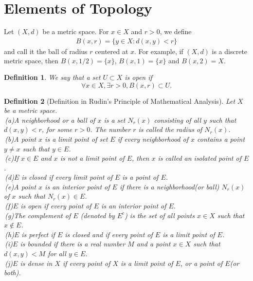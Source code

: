 \documentclass[12pt,leqno]{amsart}
\newtheorem{definition}{Definition}[section]
\theoremstyle{definition}
\begin{document}
\section{Elements of Topology}
\hspace*{1em}Let $(X,d)$ be a metric space. For $x\in X$ and $r>0$, we define 
\begin{align*}
    B(x,r) = \{y\in X: d(x,y) < r\}
\end{align*}
and call it the ball of radius $r$ centered at $x$. For example, if $(X,d)$ is a discrete metric space, then $B(x,1/2) = \{x\}$, $B(x,1) = \{x\}$ and $B(x,2) = X$.

\begin{definition}\label{openset}
We say that a set $U\subset X$ is open if $$\forall x\in X, \exists r > 0, B(x,r)\subset U.$$
\end{definition}

\begin{definition}[Definition in Rudin's Principle of Mathematical Analysis]Let $X$ be a metric space. \medskip \\
\hspace*{1em}\,(a)A neighborhood or a ball of $x$ is a set $N_r(x)$ consisting of all $y$ such that $d(x,y)<r$, \hspace*{2.3em}for some $r>0$. The number $r$ is called the radius of $N_r(x)$.\\
\hspace*{1em}\,(b)A point $x$ is a limit point of set $E$ if every neighborhood of $x$ contains a point $y\neq x$ \hspace*{2.3em}such that $y\in E$.\\
\hspace*{1em}\,(c)If $x\in E$ and $x$ is not a limit point of $E$, then $x$ is called an isolated point of $E$.\\
\hspace*{1em}\,(d)$E$ is closed if every limit point of $E$ is a point of $E$.\\
\hspace*{1em}\,(e)A point $x$ is an interior point of $E$ if there is a neighborhood(or ball) $N_r(x)$ of $x$ such \hspace*{2.3em}that $N_r(x)\in E$.\\
\hspace*{1em}\,(f)$E$ is open if every point of $E$ is an interior point of $E$.\\
\hspace*{1em}\,(g)The complement of $E$ (denoted by $E^c$) is the set of all points $x\in X$ such that $x\notin E$.\\
\hspace*{1em}\,(h)$E$ is perfect if $E$ is closed and if every point of $E$ is a limit point of $E$.\\
\hspace*{1em}\,(i)$E$ is bounded if there is a real number $M$ and a point $x\in X$ such that $d(x, y) < M$ \hspace*{2.3em} for all $y\in E$.\\
\hspace*{1em}\,(j)$E$ is dense in $X$ if every point of $X$ is a limit point of $E$, or a point of $E$(or both).
\end{definition}
\end{document}
